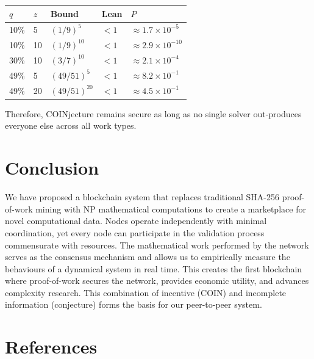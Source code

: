 \documentclass[12pt,letterpaper]{article}
\begin{document}
\begin{center}
\begin{tabular}{lllll}
\toprule
$q$ & $z$ & Bound & Lean & $P$ \\
\midrule
10\% & 5  & $(1/9)^5$    & $< 1$ & $\approx 1.7 \times 10^{-5}$  \\
10\% & 10 & $(1/9)^{10}$ & $< 1$ & $\approx 2.9 \times 10^{-10}$ \\
30\% & 10 & $(3/7)^{10}$ & $< 1$ & $\approx 2.1 \times 10^{-4}$  \\
49\% & 5  & $(49/51)^5$  & $< 1$ & $\approx 8.2 \times 10^{-1}$  \\
49\% & 20 & $(49/51)^{20}$ & $< 1$ & $\approx 4.5 \times 10^{-1}$ \\
\bottomrule
\end{tabular}
\end{center}

Therefore, COINjecture remains secure as long as no single solver out-produces everyone else across all
work types.

\section*{Conclusion}

We have proposed a blockchain system that replaces traditional SHA-256 proof-of-work mining with NP
mathematical computations to create a marketplace for novel computational data. Nodes operate
independently with minimal coordination, yet every node can participate in the validation process
commensurate with resources. The mathematical work performed by the network serves as the consensus
mechanism and allows us to empirically measure the behaviours of a dynamical system in real time. This
creates the first blockchain where proof-of-work secures the network, provides economic utility, and
advances complexity research. This combination of incentive (COIN) and incomplete information
(conjecture) forms the basis for our peer-to-peer system.

\section*{References}
\end{document}

